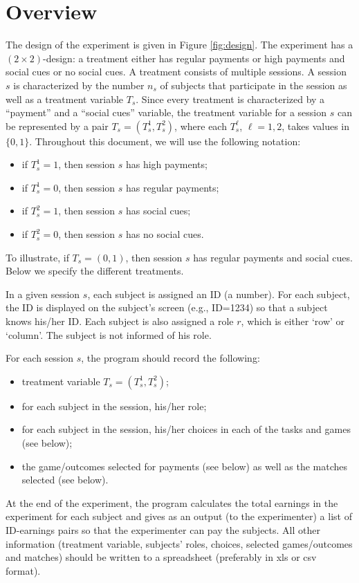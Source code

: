\documentclass[11pt]{article}
\begin{document}
\section{Overview}

The design of the experiment is given in Figure \ref{fig:design}. The experiment has a $(2 \times 2)$-design: a treatment either has regular payments or high payments and social cues or no social cues. A treatment consists of multiple sessions. A session $s$ is characterized by the number $n_s$ of subjects that participate in the session as well as a treatment variable $T_s$. Since every treatment is characterized by a ``payment'' and a ``social cues'' variable, the treatment variable for a session $s$ can be represented by a pair $T_s=(T_s^1,T_s^2)$, where each $T_s^\ell$, $\ell=1,2$, takes values in $\{0,1\}$. Throughout this document, we will use the following notation:
\begin{itemize}
\item if $T_s^1=1$, then session $s$ has high payments;
\item if $T_s^1=0$, then session $s$ has regular payments;
\item if $T_s^2=1$, then session $s$ has social cues;
\item if $T_s^2=0$, then session $s$ has no social cues.
\end{itemize}
To illustrate, if $T_s=(0,1)$, then session $s$ has regular payments and social cues. Below we specify the different treatments.


In a given session $s$, each subject is assigned an ID (a number). For each subject, the ID is displayed on the subject's screen (e.g., ID=1234) so that a subject knows his/her ID. Each subject is also assigned a role $r$, which is either `row' or `column'. The subject is not informed of his role.

For each session $s$, the program should record the following:
\begin{itemize}
\item treatment variable $T_s=(T_s^1,T_s^2)$;
\item for each subject in the session, his/her role;
\item for each subject in the session, his/her choices in each of the tasks and games (see below);
\item the game/outcomes selected for payments (see below) as well as the matches selected (see below).
\end{itemize}
At the end of the experiment, the program calculates the total earnings in the experiment for each subject and gives as an output (to the experimenter) a list of ID-earnings pairs so that the experimenter can pay the subjects. All other information (treatment variable, subjects' roles, choices, selected games/outcomes and matches) should be written to a spreadsheet (preferably in xls or csv format).
\end{document}
